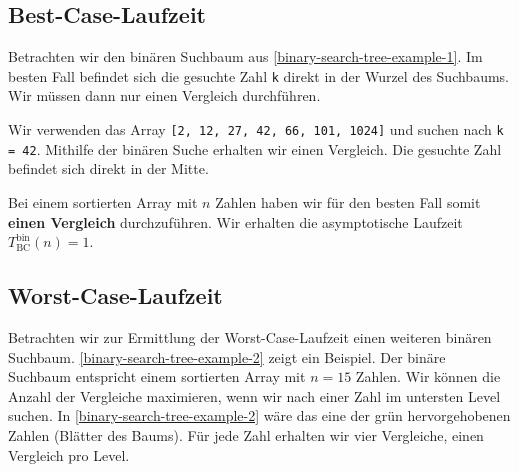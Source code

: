 \newpage

\subsection{Best-Case-Laufzeit}

Betrachten wir den binären Suchbaum aus \autoref{binary-search-tree-example-1}. Im besten Fall befindet sich die gesuchte Zahl  \lstinline[language=pseudocode]{k} direkt in der Wurzel des Suchbaums. Wir müssen dann nur einen Vergleich durchführen.

\begin{example}
	Wir verwenden das Array \lstinline[language=pseudocode]{[2, 12, 27, 42, 66, 101, 1024]} und suchen nach  \lstinline[language=pseudocode]{k = 42}. Mithilfe der binären Suche erhalten wir einen Vergleich. Die gesuchte Zahl befindet sich direkt in der Mitte.
\end{example}

Bei einem sortierten Array mit $n$ Zahlen haben wir für den besten Fall somit \textbf{einen Vergleich} durchzuführen. Wir erhalten die asymptotische Laufzeit $T_{\text{BC}}^{\text{bin}}(n) = 1$.


\subsection{Worst-Case-Laufzeit}

Betrachten wir zur Ermittlung der Worst-Case-Laufzeit einen weiteren binären Suchbaum. \autoref{binary-search-tree-example-2} zeigt ein Beispiel. Der binäre Suchbaum entspricht einem sortierten Array mit $n = 15$ Zahlen. Wir können die Anzahl der Vergleiche maximieren, wenn wir nach einer Zahl im untersten Level suchen. In \autoref{binary-search-tree-example-2} wäre das eine der grün hervorgehobenen Zahlen (Blätter des Baums). Für jede Zahl erhalten wir vier Vergleiche, einen Vergleich pro Level.

